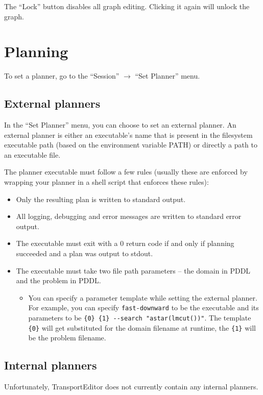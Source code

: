 \documentclass[12pt,a4paper,twoside]{article}
\begin{document}
The ``Lock'' button disables all graph editing. Clicking it again will unlock the graph.

\section{Planning}
To set a planner, go to the ``Session'' $\to$ ``Set Planner'' menu.

\subsection{External planners}
In the ``Set Planner'' menu, you can choose to set an external planner. An external planner is either an
executable's name that is present in the filesystem executable path (based on the environment variable PATH)
or directly a path to an executable file.

The planner executable must follow a few rules (usually these are enforced by wrapping your planner in a shell script
that enforces these rules):

\begin{itemize}

\item Only the resulting plan is written to standard output.

\item All logging, debugging and error messages are written to standard error output.

\item The executable must exit with a 0 return code if and only if planning succeeded and a plan was output to stdout.

\item The executable must take two file path parameters -- the domain in PDDL and the problem in PDDL.

\begin{itemize}

\item You can specify a parameter template while setting the external planner. For example, you can specify \texttt{fast-downward}
to be the executable and its parameters to be \verb+{0} {1} --search "astar(lmcut())"+. The template \verb+{0}+ will get
substituted for the domain filename at runtime, the \verb+{1}+ will be the problem filename.

\end{itemize}

\end{itemize}

\subsection{Internal planners}
Unfortunately, TransportEditor does not currently contain any internal planners.
\end{document}

